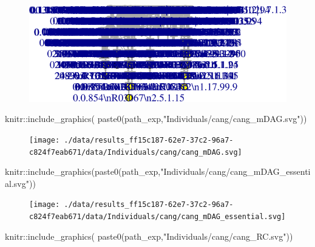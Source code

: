 \documentclass[
  letterpaper,
  DIV=11,
  numbers=noendperiod]{scrreprt}
\newenvironment{Shaded}{\begin{snugshade}}{\end{snugshade}}
\newcommand{\FunctionTok}[1]{\textcolor[rgb]{0.28,0.35,0.67}{#1}}
\newcommand{\NormalTok}[1]{\textcolor[rgb]{0.00,0.23,0.31}{#1}}
\newcommand{\SpecialCharTok}[1]{\textcolor[rgb]{0.37,0.37,0.37}{#1}}
\newcommand{\StringTok}[1]{\textcolor[rgb]{0.13,0.47,0.30}{#1}}
\begin{document}
\begin{figure}[H]

{\centering \includegraphics{./kernel_1_files/figure-pdf/unnamed-chunk-2-1.pdf}

}

\end{figure}

\begin{Shaded}
\begin{Highlighting}[]
\NormalTok{knitr}\SpecialCharTok{::}\FunctionTok{include\_graphics}\NormalTok{(}
  \FunctionTok{paste0}\NormalTok{(path\_exp,}\StringTok{"Individuals/cang/cang\_mDAG.svg"}\NormalTok{))}
\end{Highlighting}
\end{Shaded}

\begin{figure}[H]

{\centering \texttt{[image: ./data/results\_ff15c187-62e7-37c2-96a7-c824f7eab671/data/Individuals/cang/cang\_mDAG.svg]}

}

\end{figure}

\begin{Shaded}
\begin{Highlighting}[]
\NormalTok{knitr}\SpecialCharTok{::}\FunctionTok{include\_graphics}\NormalTok{(}\FunctionTok{paste0}\NormalTok{(path\_exp,}\StringTok{"Individuals/cang/cang\_mDAG\_essential.svg"}\NormalTok{))}
\end{Highlighting}
\end{Shaded}

\begin{figure}[H]

{\centering \texttt{[image: ./data/results\_ff15c187-62e7-37c2-96a7-c824f7eab671/data/Individuals/cang/cang\_mDAG\_essential.svg]}

}

\end{figure}

\begin{Shaded}
\begin{Highlighting}[]
\NormalTok{knitr}\SpecialCharTok{::}\FunctionTok{include\_graphics}\NormalTok{(}
  \FunctionTok{paste0}\NormalTok{(path\_exp,}\StringTok{"Individuals/cang/cang\_RC.svg"}\NormalTok{))}
\end{Highlighting}
\end{Shaded}
\end{document}
